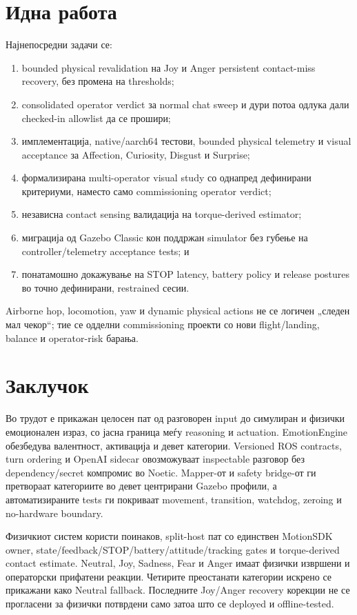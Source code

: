 \section{Идна работа}

Најнепосредни задачи се:

\begin{enumerate}
  \item bounded physical revalidation на Joy и Anger persistent contact-miss
  recovery, без промена на thresholds;
  \item consolidated operator verdict за normal chat sweep и дури потоа
  одлука дали checked-in allowlist да се прошири;
  \item имплементација, native/aarch64 тестови, bounded physical telemetry и
  visual acceptance за Affection, Curiosity, Disgust и Surprise;
  \item формализирана multi-operator visual study со однапред дефинирани
  критериуми, наместо само commissioning operator verdict;
  \item независна contact sensing валидација на torque-derived estimator;
  \item миграција од Gazebo Classic кон поддржан simulator без губење на
  controller/telemetry acceptance tests; и
  \item понатамошно докажување на STOP latency, battery policy и release
  postures во точно дефинирани, restrained сесии.
\end{enumerate}

Airborne hop, locomotion, yaw и dynamic physical actions не се логичен „следен
мал чекор“; тие се одделни commissioning проекти со нови flight/landing,
balance и operator-risk барања.

\section{Заклучок}

Во трудот е прикажан целосен пат од разговорен input до симулиран и физички
емоционален израз, со јасна граница меѓу reasoning и actuation. EmotionEngine
обезбедува валентност, активација и девет категории. Versioned ROS contracts,
turn ordering и OpenAI sidecar овозможуваат inspectable разговор без
dependency/secret компромис во Noetic. Mapper-от и safety bridge-от ги
претвораат категориите во девет центрирани Gazebo профили, а автоматизираните
tests ги покриваат movement, transition, watchdog, zeroing и no-hardware
boundary.

Физичкиот систем користи поинаков, split-host пат со единствен MotionSDK owner,
state/feedback/STOP/battery/attitude/tracking gates и torque-derived contact
estimate. Neutral, Joy, Sadness, Fear и Anger имаат физички извршени и
операторски прифатени реакции. Четирите преостанати категории искрено се
прикажани како Neutral fallback. Последните Joy/Anger recovery корекции не се
прогласени за физички потврдени само затоа што се deployed и offline-tested.

